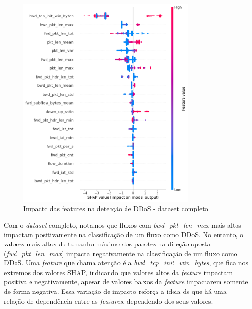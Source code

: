 \documentclass[12pt]{article}
\begin{document}
\begin{figure}[h!]
    \centering
    \includegraphics[width=0.8\textwidth]{figures/summary_ddos_completo.png}
    \caption{Impacto das features na detecção de DDoS - dataset completo}
    \label{fig:summary_ddos_completo}
\end{figure}

Com o \emph{dataset} completo, notamos que fluxos com \textit{bwd\_pkt\_len\_max} mais altos impactam positivamente na classificação de um fluxo como DDoS. No entanto, o valores mais altos do tamanho máximo dos pacotes na direção oposta (\textit{fwd\_pkt\_len\_max}) impacta negativamente na classificação de um fluxo como DDoS. Uma \emph{feature} que chama atenção é a \textit{bwd\_tcp\_init\_win\_bytes}, que fica nos extremos dos valores SHAP, indicando que valores altos da \emph{feature} impactam positiva e negativamente, apesar de valores baixos da \emph{feature} impactarem somente de forma negativa. Essa variação de impacto reforça a ideia de que há uma relação de dependência entre as \emph{features}, dependendo dos seus valores.
\end{document}
